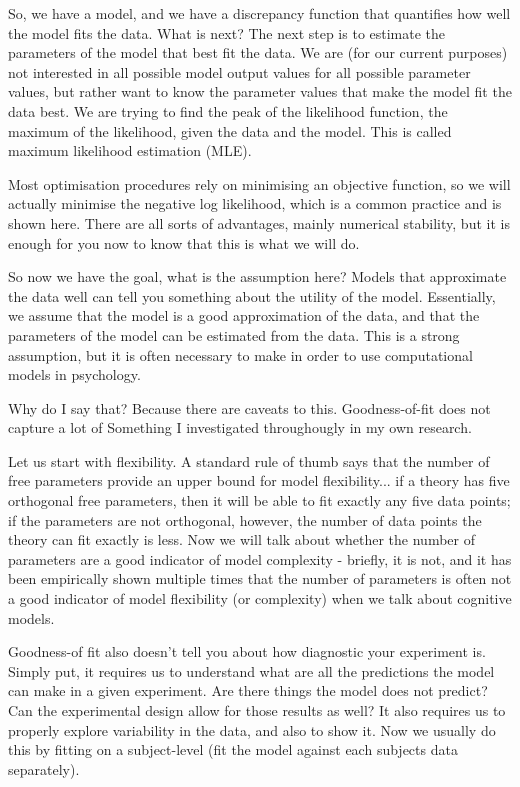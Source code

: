 \documentclass[12pt]{article}
\begin{document}
So, we have a model, and we have a discrepancy function that quantifies how well the model fits the data. What is next? The next step is to estimate the parameters of the model that best fit the data. We are (for our current purposes) not interested in all possible model output values for all possible parameter values, but rather want to know the parameter values that make the model fit the data best. We are trying to find the peak of the likelihood function, the maximum of the likelihood, given the data and the model. This is called maximum likelihood estimation (MLE). 

Most optimisation procedures rely on minimising an objective function, so we will actually minimise the negative log likelihood, which is a common practice and is shown here. There are all sorts of advantages, mainly numerical stability, but it is enough for you now to know that this is what we will do.

So now we have the goal, what is the assumption here? Models that approximate the data well can tell you something about the utility of the model. Essentially, we assume that the model is a good approximation of the data, and that the parameters of the model can be estimated from the data. This is a strong assumption, but it is often necessary to make in order to use computational models in psychology.

Why do I say that? Because there are caveats to this. Goodness-of-fit does not capture a lot of  Something I investigated throughougly in my own research.

Let us start with flexibility. A standard rule of thumb says that the number of free parameters provide an upper bound for model flexibility... if a theory has five orthogonal free parameters, then it will be able to fit exactly any five data points; if the parameters are not orthogonal, however, the number of data points the theory can fit exactly is less. Now we will talk about whether the number of parameters are a good indicator of model complexity - briefly, it is not, and it has been empirically shown multiple times that the number of parameters is often not a good indicator of model flexibility (or complexity) when we talk about cognitive models. 

Goodness-of fit also doesn't tell you about how diagnostic your experiment is. Simply put, it requires us to understand what are all the predictions the model can make in a given experiment. Are there things the model does not predict? Can the experimental design allow for those results as well? It also requires us to properly explore variability in the data, and also to show it. Now we usually do this by fitting on a subject-level (fit the model against each subjects data separately).
\end{document}
